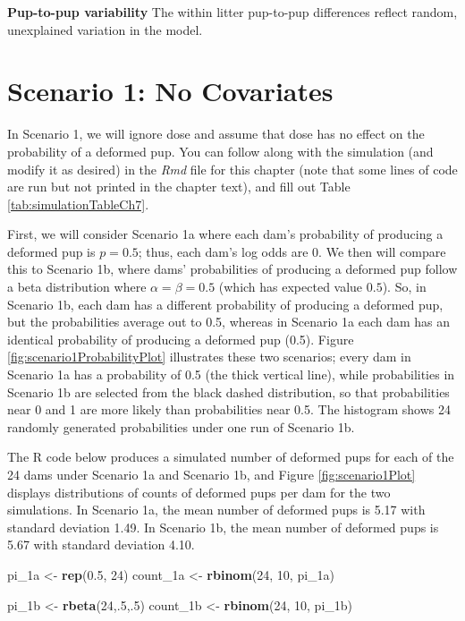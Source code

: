 \documentclass[
]{krantz}
\newenvironment{Shaded}{\begin{snugshade}}{\end{snugshade}}
\newcommand{\DecValTok}[1]{\textcolor[rgb]{0.06,0.06,0.06}{#1}}
\newcommand{\FloatTok}[1]{\textcolor[rgb]{0.06,0.06,0.06}{#1}}
\newcommand{\FunctionTok}[1]{\textcolor[rgb]{0.27,0.27,0.27}{\textbf{#1}}}
\newcommand{\NormalTok}[1]{#1}
\newcommand{\OtherTok}[1]{\textcolor[rgb]{0.37,0.37,0.37}{#1}}
\begin{document}
\textbf{Pup-to-pup variability} The within litter pup-to-pup differences reflect random, unexplained variation in the model.

\section{Scenario 1: No Covariates}\label{scenario-1-no-covariates}

In Scenario 1, we will ignore dose and assume that dose has no effect on the probability of a deformed pup. You can follow along with the simulation (and modify it as desired) in the \emph{Rmd} file for this chapter (note that some lines of code are run but not printed in the chapter text), and fill out Table \ref{tab:simulationTableCh7}.

First, we will consider Scenario 1a where each dam's probability of producing a deformed pup is \(p = 0.5\); thus, each dam's log odds are 0. We then will compare this to Scenario 1b, where dams' probabilities of producing a deformed pup follow a beta distribution where \(\alpha = \beta = 0.5\) (which has expected value \(0.5\)). So, in Scenario 1b, each dam has a different probability of producing a deformed pup, but the probabilities average out to 0.5, whereas in Scenario 1a each dam has an identical probability of producing a deformed pup (0.5). Figure \ref{fig:scenario1ProbabilityPlot} illustrates these two scenarios; every dam in Scenario 1a has a probability of 0.5 (the thick vertical line), while probabilities in Scenario 1b are selected from the black dashed distribution, so that probabilities near 0 and 1 are more likely than probabilities near 0.5. The histogram shows 24 randomly generated probabilities under one run of Scenario 1b.

The R code below produces a simulated number of deformed pups for each of the 24 dams under Scenario 1a and Scenario 1b, and Figure \ref{fig:scenario1Plot} displays distributions of counts of deformed pups per dam for the two simulations. In Scenario 1a, the mean number of deformed pups is 5.17 with standard deviation 1.49. In Scenario 1b, the mean number of deformed pups is 5.67 with standard deviation 4.10.

\begin{Shaded}
\begin{Highlighting}[]
\NormalTok{pi\_1a }\OtherTok{\textless{}{-}} \FunctionTok{rep}\NormalTok{(}\FloatTok{0.5}\NormalTok{, }\DecValTok{24}\NormalTok{)}
\NormalTok{count\_1a }\OtherTok{\textless{}{-}} \FunctionTok{rbinom}\NormalTok{(}\DecValTok{24}\NormalTok{, }\DecValTok{10}\NormalTok{, pi\_1a)}

\NormalTok{pi\_1b }\OtherTok{\textless{}{-}} \FunctionTok{rbeta}\NormalTok{(}\DecValTok{24}\NormalTok{,.}\DecValTok{5}\NormalTok{,.}\DecValTok{5}\NormalTok{)  }
\NormalTok{count\_1b }\OtherTok{\textless{}{-}} \FunctionTok{rbinom}\NormalTok{(}\DecValTok{24}\NormalTok{, }\DecValTok{10}\NormalTok{, pi\_1b)  }
\end{Highlighting}
\end{Shaded}
\end{document}
